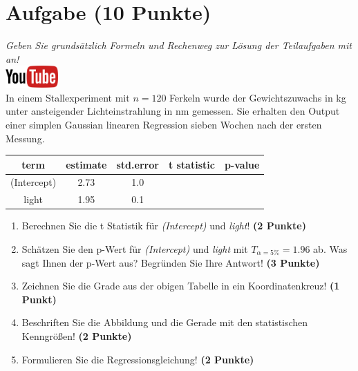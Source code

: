 \documentclass[a4paper, 9pt]{scrartcl}\usepackage[]{graphicx}\usepackage[]{xcolor}
\begin{document}
\section{Aufgabe \hfill (10 Punkte)}

\textit{Geben Sie grunds{\"a}tzlich Formeln und Rechenweg zur L{\"o}sung der
  Teilaufgaben mit an!} \\[1Ex]

\hfill\href{https://youtu.be/lJp8rFmMnrs}{\includegraphics[width =
  2cm]{img/youtube}}\\[1Ex]



In einem Stallexperiment mit $n = 120$ Ferkeln wurde der
Gewichtszuwachs in kg unter ansteigender Lichteinstrahlung in nm
gemessen. Sie erhalten den \Rlogo Output einer simplen Gaussian linearen
Regression sieben Wochen nach der ersten Messung.

\begin{table}[!h]
\centering\begingroup\fontsize{14}{16}\selectfont

\begin{tabular}{ccccc}
\toprule
term & estimate & std.error & t statistic & p-value\\
\midrule
(Intercept) & 2.73 & 1.0 &  & \\
light & 1.95 & 0.1 &  & \\
\bottomrule
\end{tabular}
\endgroup{}
\end{table}



\begin{enumerate}
\item Berechnen Sie die t Statistik f{\"u}r \textit{(Intercept)} und
  \textit{light}! \textbf{(2 Punkte)}
\item Sch{\"a}tzen Sie den p-Wert f{\"u}r \textit{(Intercept)} und
  \textit{light} mit $T_{\alpha = 5\%} = 1.96$ ab. Was sagt Ihnen der p-Wert aus?
  Begr{\"u}nden Sie Ihre Antwort! \textbf{(3 Punkte)}
\item Zeichnen Sie die Grade aus der obigen Tabelle in ein Koordinatenkreuz! \textbf{(1 Punkt)}
\item Beschriften Sie die Abbildung und die Gerade mit den statistischen
  Kenngr{\"o}{\ss}en! \textbf{(2 Punkte)}
\item Formulieren Sie die Regressionsgleichung! \textbf{(2 Punkte)}
\end{enumerate} 
\clearpage
\end{document}
